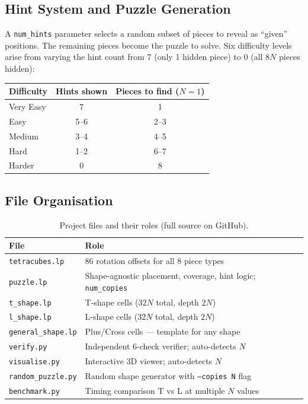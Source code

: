 \documentclass[12pt,a4paper]{article}
\begin{document}
\subsection{Hint System and Puzzle Generation}

A \texttt{num\_hints} parameter selects a random subset of pieces to reveal
as ``given'' positions.  The remaining pieces become the puzzle to solve.
Six difficulty levels arise from varying the hint count from 7 (only 1 hidden
piece) to 0 (all $8N$ pieces hidden):

\begin{center}
\begin{tabular}{@{}lcc@{}}
  \toprule
  \textbf{Difficulty} & \textbf{Hints shown} & \textbf{Pieces to find ($N=1$)} \\
  \midrule
  Very Easy & 7   & 1 \\
  Easy      & 5--6 & 2--3 \\
  Medium    & 3--4 & 4--5 \\
  Hard      & 1--2 & 6--7 \\
  Harder    & 0   & 8 \\
  \bottomrule
\end{tabular}
\end{center}

\subsection{File Organisation}

\begin{table}[H]
\centering
\caption{Project files and their roles (full source on GitHub).}
\label{tab:files}
\renewcommand{\arraystretch}{1.25}
\begin{tabular}{@{}ll@{}}
  \toprule
  \textbf{File} & \textbf{Role} \\
  \midrule
  \texttt{tetracubes.lp}      & 86 rotation offsets for all 8 piece types \\
  \texttt{puzzle.lp}          & Shape-agnostic placement, coverage, hint logic; \texttt{num\_copies} \\
  \texttt{t\_shape.lp}        & T-shape cells ($32N$ total, depth $2N$) \\
  \texttt{l\_shape.lp}        & L-shape cells ($32N$ total, depth $2N$) \\
  \texttt{general\_shape.lp}  & Plus/Cross cells --- template for any shape \\
  \texttt{verify.py}          & Independent 6-check verifier; auto-detects $N$ \\
  \texttt{visualise.py}       & Interactive 3D viewer; auto-detects $N$ \\
  \texttt{random\_puzzle.py}  & Random shape generator with \texttt{--copies N} flag \\
  \texttt{benchmark.py}       & Timing comparison T vs L at multiple $N$ values \\
  \bottomrule
\end{tabular}
\end{table}
\end{document}

